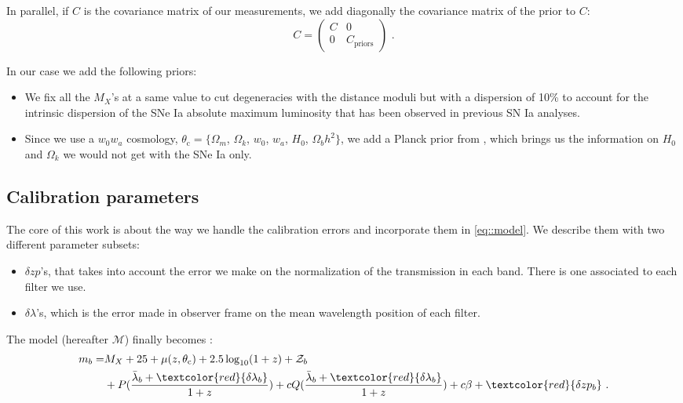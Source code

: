 \documentclass[\docopts]{\docclass}
\begin{document}
In parallel, if $C$ is the covariance matrix of our measurements, we add diagonally the covariance matrix of the prior to $C$:
\begin{equation}
C =
\begin{pmatrix}
  C & 0 \\
  0 & C_\text{priors}
\end{pmatrix} \text{ .} 
\end{equation}

In our case we add the following priors:
\begin{itemize}
\item We fix all the $M_X$'s at a same value to cut degeneracies with the distance moduli but with a dispersion of 10\% to account for the intrinsic dispersion of the SNe Ia absolute maximum luminosity that has been observed in previous SN Ia analyses.
\item Since we use a $w_0w_a$ cosmology, $\theta_\text{c} = \{ \Omega_m$, $\Omega_k$, $w_0$, $w_a$, $H_0$, $\Omega_bh^2 \}$, we add a Planck prior from \cite{1502.01589}, which brings us the information on $H_0$ and $\Omega_k$ we would not get with the SNe Ia only.
\end{itemize}


\subsection{Calibration parameters}
\label{subsec::calib_uncertainties}
The core of this work is about the way we handle the calibration errors and incorporate them in \ref{eq::model}.
We describe them with two different parameter subsets:
\begin{itemize}
\item $\delta zp$'s, that takes into account the error we make on the normalization of the transmission in each band.
There is one associated to each filter we use.
\item $\delta \lambda$'s, which is the error made in observer frame on the mean wavelength position of each filter. 
\end{itemize}

The model (hereafter $\mathcal{M}$) finally becomes :
\begin{equation}
\begin{split}
m_b = & M_X + 25 + \mu(z, \theta_\text{c}) + 2.5\log_{10}(1+z) + \mathcal{Z}_b \\
&+ P(\frac{\bar\lambda_b  + \textcolor{red}{\delta\lambda_b}}{1+z}) + cQ(\frac{\bar\lambda_b  + \textcolor{red}{\delta\lambda_b}}{1+z}) + {c\beta} + \textcolor{red}{\delta zp_b} \text{ .}
\end{split}
\end{equation}
\end{document}
